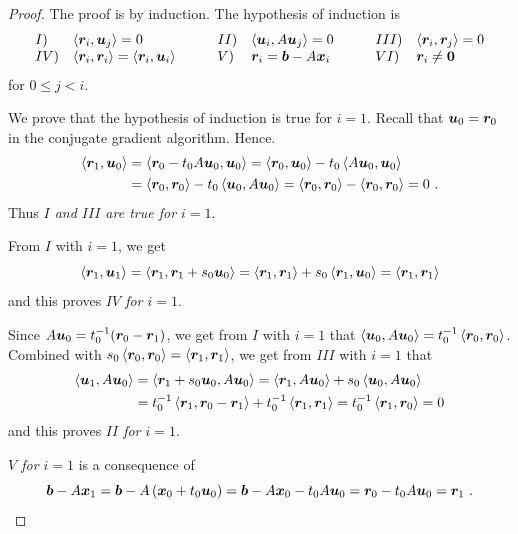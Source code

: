 \begin{proof}
The proof is by induction.  The hypothesis of induction is
\[
\begin{array}{ll@{\hspace{3em}}ll@{\hspace{3em}}ll}
I) & \ps{\VEC{r}_i}{\VEC{u}_j} = 0 &
II) & \ps{\VEC{u}_i}{A\VEC{u}_j} = 0 &
III) & \ps{\VEC{r}_i}{\VEC{r}_j} = 0 \\
IV) & \ps{\VEC{r}_i}{\VEC{r}_i} = \ps{\VEC{r}_i}{\VEC{u}_i} &
V) & \VEC{r}_i = \VEC{b}-A\VEC{x}_i &
VI) & \VEC{r}_i \neq \VEC{0}
\end{array}
\]
for $0 \leq j < i$.


We prove that the hypothesis of induction is true for $i=1$.
Recall that $\bm{u}_0 = \bm{r}_0$ in the conjugate gradient
algorithm.  Hence.
\begin{align*}
\left\langle{\bm{r}_1} , {\bm{u}_0}\right\rangle &= \left\langle{\bm{r}_0 - t_0 A \bm{u}_0} , {\bm{u}_0}\right\rangle
= \left\langle{\bm{r}_0} , {\bm{u}_0}\right\rangle - t_0 \left\langle{A\bm{u}_0} , {\bm{u}_0}\right\rangle \\
&= \left\langle{\bm{r}_0} , {\bm{r}_0}\right\rangle - t_0 \left\langle{\bm{u}_0} , {A\bm{u}_0}\right\rangle
= \left\langle{\bm{r}_0} , {\bm{r}_0}\right\rangle - \left\langle{\bm{r}_0} , {\bm{r}_0}\right\rangle = 0 \ .
\end{align*}
Thus {\em $I$ and $III$ are true for $i=1$}.

From $I$ with $i=1$, we get
\[
\left\langle{\bm{r}_1} , {\bm{u}_1}\right\rangle = \left\langle{\bm{r}_1} , {\bm{r}_1 + s_0\bm{u}_0}\right\rangle
= \left\langle{\bm{r}_1} , {\bm{r}_1}\right\rangle + s_0 \left\langle{\bm{r}_1} , {\bm{u}_0}\right\rangle
= \left\langle{\bm{r}_1} , {\bm{r}_1}\right\rangle
\]
and this proves {\em $IV$ for $i=1$}.

Since $\displaystyle A\bm{u}_0 = t_0^{-1}(\bm{r}_0 - \bm{r}_1)$,
we get from $I$ with $i=1$ that
$\left\langle{\bm{u}_0} , {A\bm{u}_0}\right\rangle = t^{-1}_0 \left\langle{\bm{r}_0} , {\bm{r}_0}\right\rangle$.
Combined with $s_0 \left\langle{\bm{r}_0} , {\bm{r}_0}\right\rangle = \left\langle{\bm{r}_1} , {\bm{r}_1}\right\rangle$, we
get from $III$ with $i=1$ that
\begin{align*}
\left\langle{\bm{u}_1} , {A\bm{u}_0}\right\rangle &= \left\langle{\bm{r}_1 + s_0\bm{u}_0} , {A\bm{u}_0}\right\rangle
= \left\langle{\bm{r}_1} , {A\bm{u}_0}\right\rangle + s_0 \left\langle{\bm{u}_0} , {A\bm{u}_0}\right\rangle \\
&= t_0^{-1}\left\langle{\bm{r}_1} , {\bm{r}_0 - \bm{r}_1}\right\rangle +
t_0^{-1} \left\langle{\bm{r}_1} , {\bm{r}_1}\right\rangle
= t_0^{-1}\left\langle{\bm{r}_1} , {\bm{r}_0}\right\rangle = 0
\end{align*}
and this proves {\em $II$ for $i=1$}.

{\em $V$ for $i=1$} is a consequence of
\[
\bm{b}-A\bm{x}_1 = \bm{b}-A\left(\bm{x}_0+t_0\bm{u}_0\right)
= \bm{b}- A\bm{x}_0 - t_0 A\bm{u}_0
= \bm{r}_0 - t_0 A\bm{u}_0 = \bm{r}_1 \ .
\]


\end{proof}
